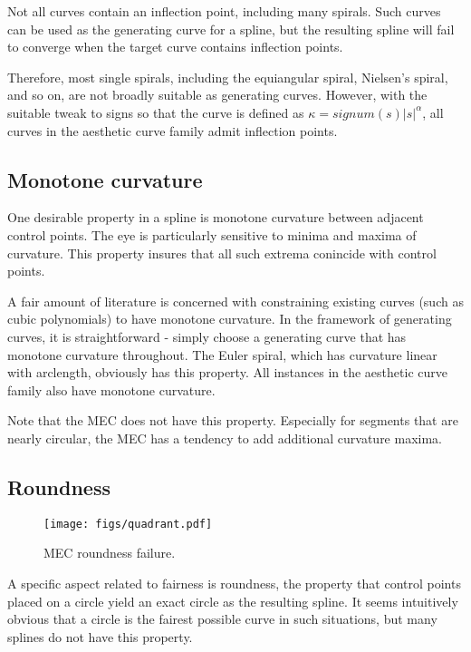 \documentclass{article}
\begin{document}
Not all curves contain an inflection point, including many
spirals. Such curves can be used as the generating curve for a spline,
but the resulting spline will fail to converge when the target curve
contains inflection points.

Therefore, most single spirals, including the equiangular spiral,
Nielsen's spiral, and so on, are not broadly suitable as generating
curves. However, with the suitable tweak to signs so that the curve is
defined as $\kappa = signum(s)|s|^\alpha$, all curves in the aesthetic
curve family admit inflection points.

\subsection{Monotone curvature}

One desirable property in a spline is monotone curvature between
adjacent control points. The eye is particularly sensitive to minima
and maxima of curvature. This property insures that all such extrema
conincide with control points.

A fair amount of literature is concerned with constraining existing
curves (such as cubic polynomials) to have monotone
curvature. In the framework of generating curves, it is
straightforward - simply choose a generating curve that has monotone
curvature throughout. The Euler spiral, which has curvature linear
with arclength, obviously has this property. All instances in the
aesthetic curve family also have monotone curvature.

Note that the MEC does not have this property. Especially for segments
that are nearly circular, the MEC has a tendency to add additional
curvature maxima.

\subsection{Roundness}

\begin{figure*}[tbh]
\begin{center}
\texttt{[image: figs/quadrant.pdf]}
\caption{\label{mec-roundness}MEC roundness failure.}
\end{center}
\end{figure*}

A specific aspect related to fairness is roundness, the property that
control points placed on a circle yield an exact circle as the resulting
spline. It seems intuitively obvious that a circle is the fairest
possible curve in such situations, but many splines do not have this
property.
\end{document}
